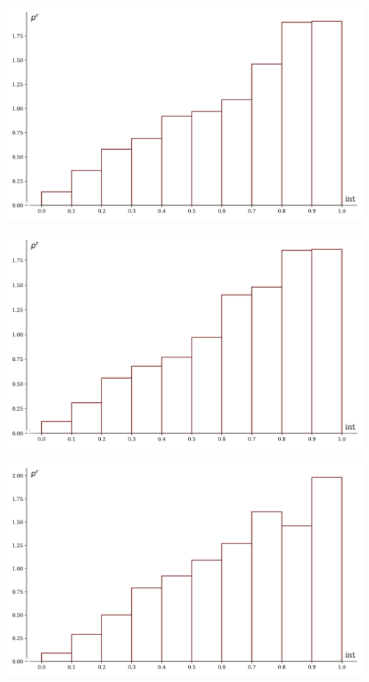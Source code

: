 \documentclass[a4paper, 14pt]{extarticle}
\begin{document}
\begin{minipage}[t]{0.25\textwidth}
\includegraphics[width=\textwidth, height=\textheight, keepaspectratio]{sample25_hist}
\end{minipage}%
\begin{minipage}[t]{0.25\textwidth}
\includegraphics[width=\textwidth, height=\textheight, keepaspectratio]{sample26_hist}
\end{minipage}%
\begin{minipage}[t]{0.25\textwidth}
\includegraphics[width=\textwidth, height=\textheight, keepaspectratio]{sample27_hist}
\end{minipage}%
\end{document}
